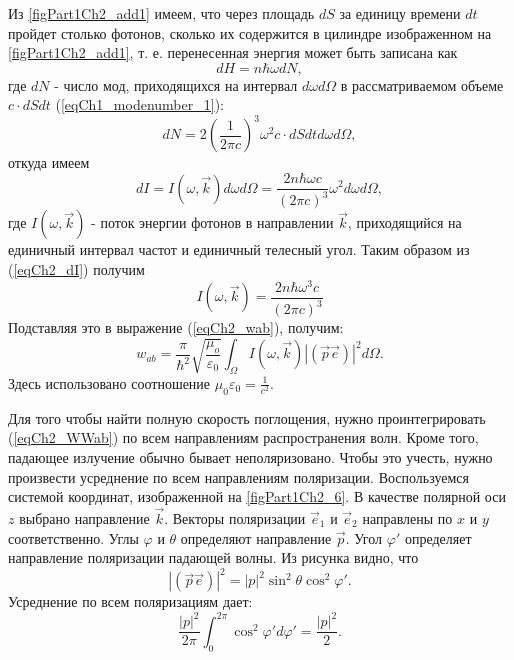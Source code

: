 Из \autoref{figPart1Ch2_add1} имеем, что через площадь $dS$ за единицу
времени $dt$ пройдет столько фотонов, сколько их содержится в цилиндре
изображенном на \autoref{figPart1Ch2_add1}, т. е. перенесенная
энергия может быть записана как
\[
dH = n \hbar \omega d N ,
\]
где $dN$ -  число мод, приходящихся на интервал $d \omega d \Omega$ в
 рассматриваемом объеме $c \cdot dS  dt$ (\ref{eqCh1_modenumber_1}):
\[
d N = 2 \left(\frac{1}{2 \pi c} \right)^3 \omega^2 
c \cdot dS  dt
d \omega d \Omega,
\]
откуда имеем 
\begin{equation}
d I = I\left(\omega, \vec{k}\right) d \omega d \Omega = 
\frac{2 n \hbar \omega c}{\left(2 \pi c\right)^3}
\omega^2 d \omega d \Omega,
\label{eqCh2_dI}
\end{equation}
где $I\left(\omega, \vec{k}\right)$ - 
поток энергии фотонов в направлении $\vec{k}$,  приходящийся на единичный
интервал частот и единичный телесный угол. Таким образом из
(\ref{eqCh2_dI}) получим 
\begin{equation}
I\left(\omega, \vec{k}\right) = 
\frac{2 n \hbar \omega^3 c}{\left(2 \pi c\right)^3}
\nonumber
\end{equation}
Подставляя это в выражение (\ref{eqCh2_wab}), получим:
\begin{equation}
w_{ab} = \frac{\pi}{\hbar^2}\sqrt{\frac{\mu_o}{\varepsilon_0}}
\int_{\Omega}I\left(\omega, \vec{k}\right)
\left|\left(\vec{p} \vec{e}\right)\right|^2
d \Omega.
\label{eqCh2_WWab}
\end{equation}
Здесь использовано соотношение $\mu_0 \varepsilon_0 = \frac{1}{c^2}$.



Для того чтобы найти полную скорость поглощения, нужно
проинтегрировать (\ref{eqCh2_WWab}) по всем направлениям
распространения волн. Кроме того, падающее излучение обычно бывает 
неполяризовано. Чтобы это учесть, нужно произвести усреднение
по всем направлениям поляризации. Воспользуемся системой
координат, изображенной на \autoref{figPart1Ch2_6}. В качестве полярной оси $z$
выбрано направление $\vec{k}$.  Векторы поляризации $\vec{e}_1$ и $\vec{e}_2$ направлены по $x$ и $y$ соответственно.
Углы $\varphi$ и $\theta$   определяют направление $\vec{p}$. 
Угол $\varphi'$ определяет направление поляризации падающей
волны. Из рисунка видно, что
\[
\left|\left(\vec{p} \vec{e}\right)\right|^2 = 
\left|p\right|^2 \sin^2 \theta \cos^2 \varphi'. 
\]
Усреднение по всем поляризациям дает: 
\begin{equation}
\frac{\left|p\right|^2}{2 \pi} \int_0^{2 \pi}
\cos^2 \varphi' d \varphi' = \frac{\left|p\right|^2}{2}.
\label{eqCh2_PolyarMedian}
\end{equation}

